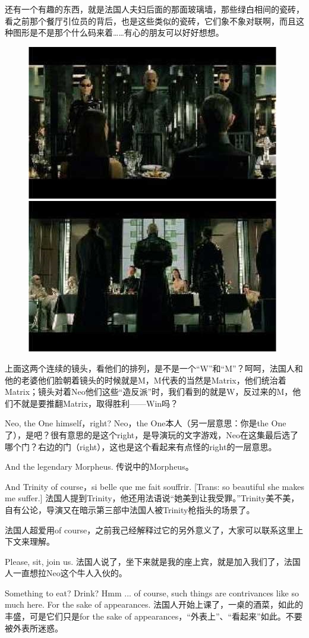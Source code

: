 \documentclass{ctexart}
\begin{document}
还有一个有趣的东西，就是法国人夫妇后面的那面玻璃墙，那些绿白相间的瓷砖，看之前那个餐厅引位员的背后，也是这些类似的瓷砖，它们象不象对联啊，而且这种图形是不是那个什么码来着……有心的朋友可以好好想想。

\begin{figure}[htb]
\centering
\includegraphics[width=0.45\linewidth]{fig/read_reloaded-91}
\includegraphics[width=0.45\linewidth]{fig/read_reloaded-91-1}
\end{figure}

上面这两个连续的镜头，看他们的排列，是不是一个“W”和“M”？呵呵，法国人和他的老婆他们脸朝着镜头的时候就是M，M代表的当然是Matrix，他们统治着Matrix；镜头对着Neo他们这些“造反派”时，我们看到的就是W，反过来的M，他们不就是要推翻Matrix，取得胜利——Win吗？

Neo, the One himself，right? Neo，the One本人（另一层意思：你是the One了），是吧？很有意思的是这个right，是导演玩的文字游戏，Neo在这集最后选了哪个门？右边的门（right），这也是这个看起来有点怪的right的一层意思。

And the legendary Morpheus. 传说中的Morpheus。

And Trinity of course，si belle que me fait souffrir. [Trans: so beautiful she makes me suffer.] 法国人提到Trinity，他还用法语说“她美到让我受罪。”Trinity美不美，自有公论，导演又在暗示第三部中法国人被Trinity枪指头的场景了。

法国人超爱用of course，之前我己经解释过它的另外意义了，大家可以联系这里上下文来理解。

Please, sit, join us. 法国人说了，坐下来就是我的座上宾，就是加入我们了，法国人一直想拉Neo这个牛人入伙的。

Something to eat? Drink? Hmm ... of course, such things are contrivances like so much here. For the sake of appearances. 法国人开始上课了，一桌的酒菜，如此的丰盛，可是它们只是for the sake of appearances，“外表上”、“看起来”如此。不要被外表所迷惑。
\end{document}
